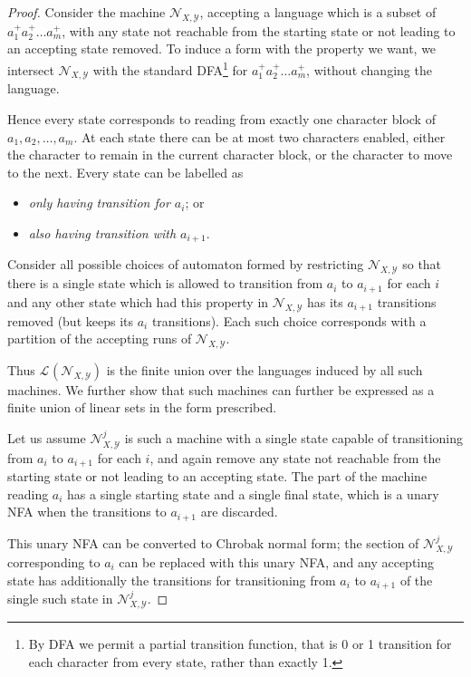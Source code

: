 \documentclass{lmcs}
\theoremstyle{plain}
\theoremstyle{definition}
\theoremstyle{remark}
\newcommand\lng[2]{\mathcal{L}_{#1}(#2)}
\newcommand\chr{a}
\begin{document}
\begin{proof}
Consider the machine $\mathcal{N}_{X,\mathcal{Y}}$, accepting a language which is a subset of $\chr_1^+\chr_2^+\dots \chr_m^+$, with any state not reachable from the starting state or not leading to an accepting state removed. To induce a form with the property we want, we intersect $\mathcal{N}_{X,\mathcal{Y}}$ with the standard DFA\footnote{By DFA we permit a partial transition function, that is 0 or 1 transition for each character from every state, rather than exactly 1.} for $\chr_1^+\chr_2^+\dots \chr_m^+$, without changing the language.

Hence every state corresponds to reading from exactly one character block of $\chr_1,\chr_2,\dots,\chr_m$. At each state there can be at most two characters enabled, either the character to remain in the current character block, or the character to move to the next. Every state can be labelled as \begin{itemize} \item  \textit{only having transition for $\chr_{i}$}; or \item \textit{also having transition with $\chr_{i+1}$}.\end{itemize} Consider all possible choices of automaton formed by restricting $\mathcal{N}_{X,\mathcal{Y}}$ so that there is a single state which is allowed to transition from $\chr_{i}$ to $\chr_{i+1}$ for each $i$ and any other state which had this property in $\mathcal{N}_{X,\mathcal{Y}}$ has its $\chr_{i+1}$ transitions removed (but keeps its $\chr_i$ transitions). Each such choice corresponds with a partition of the accepting runs of $\mathcal{N}_{X,\mathcal{Y}}$.

Thus $\lng{}{\mathcal{N}_{X,\mathcal{Y}}}$ is the finite union over the languages induced by all such machines. We further show that such machines can further be expressed as a finite union of  linear sets in the form prescribed.

Let us assume $\mathcal{N}_{X,\mathcal{Y}}^j$ is such a machine with a single state capable of transitioning from $\chr_{i}$ to $\chr_{i+1}$ for each $i$, and again remove any state not reachable from the starting state or not leading to an accepting state. The part of the machine reading $a_i$ has a single starting state and a single final state, which is a unary NFA when the transitions to $\chr_{i+1}$ are discarded.

This unary NFA can be converted to Chrobak normal form; the section of  $\mathcal{N}_{X,\mathcal{Y}}^j$ corresponding to $a_i$ can be replaced with this unary NFA, and any accepting state has additionally the transitions for transitioning from $\chr_{i}$ to $\chr_{i+1}$ of the single such state in $\mathcal{N}_{X,\mathcal{Y}}^j$.


\end{proof}
\end{document}
